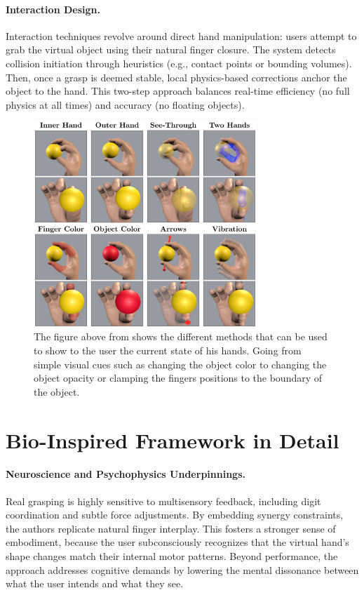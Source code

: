 \documentclass[11pt]{llncs}
\begin{document}
\paragraph{Interaction Design.}
Interaction techniques revolve around direct hand manipulation: users attempt to grab the virtual object using their natural finger closure. The system detects collision initiation through heuristics (e.g., contact points or bounding volumes). Then, once a grasp is deemed stable, local physics-based corrections anchor the object to the hand. This two-step approach balances real-time efficiency (no full physics at all times) and accuracy (no floating objects).

\begin{figure}[H]
\centering
\includegraphics[width=0.75\textwidth]{Virtual Hand-Object.png}
\caption{The figure above from \cite{Mangalam2024} shows the different methods that can be used to show to the user the current state of his hands. Going from simple visual cues such as changing the object color to changing the object opacity or clamping the fingers positions to the boundary of the object.}
\label{fig:virtual-hands}
\end{figure}

\section*{Bio-Inspired Framework in Detail}
\paragraph{Neuroscience and Psychophysics Underpinnings.}
Real grasping is highly sensitive to multisensory feedback, including digit coordination and subtle force adjustments. By embedding synergy constraints, the authors replicate natural finger interplay. This fosters a stronger sense of embodiment, because the user subconsciously recognizes that the virtual hand’s shape changes match their internal motor patterns. Beyond performance, the approach addresses cognitive demands by lowering the mental dissonance between what the user intends and what they see.
\end{document}
